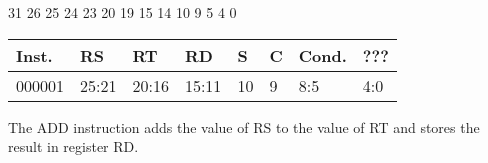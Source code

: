 \documentclass[12pt]{article}
\begin{document}
    \hspace{1.6cm}31 \hspace{1.2cm}26 \hspace{.075cm}25 \hspace{.15cm}24 \hspace{.075cm}23 \hspace{.875cm}20 \hspace{.04cm}19 \hspace{.8cm}15 \hspace{.04cm}14 \hspace{.8cm}10 \hspace{.04cm}9 \hspace{1.15cm}5 \hspace{.04cm}4 \hspace{1.25cm}0
    \vspace{-.25cm}
       \begin{center}
        \begin{tabular}{ |p{1.8cm}|p{1.5cm}|p{1.5cm}|p{1.5cm}|p{0.3cm}|p{0.3cm}|p{1.5cm}|p{1.5cm}| }
            \hline
            \textbf{Inst.} & \textbf{RS}& \textbf{RT} & \textbf{RD} & \textbf{S} & \textbf{C} & \textbf{Cond.} & ???\\
            \hline
            000001& 25:21 & 20:16 & 15:11 & 10 & 9 & 8:5 &4:0\\
            \hline
        \end{tabular}
    \end{center}
    
    \noindent
    The ADD instruction adds the value of RS to the value of RT and stores the result in register RD. 
    
\end{document}
